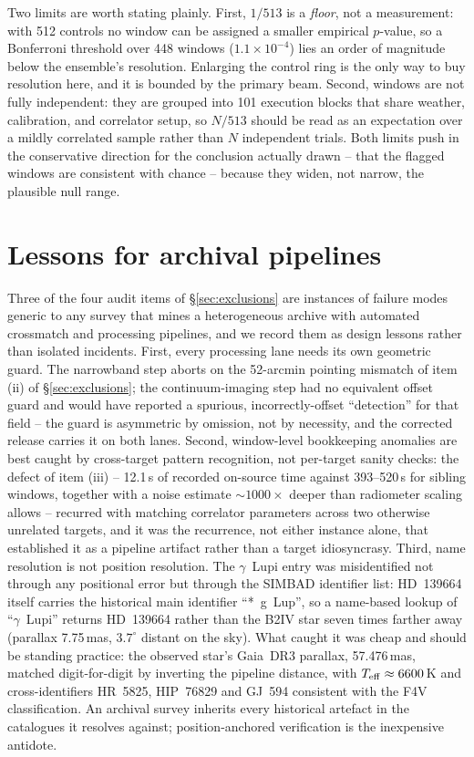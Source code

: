 \documentclass{openjournal}
\begin{document}
Two limits are worth stating plainly. First, $1/513$ is a
\emph{floor}, not a measurement: with 512 controls no window can be
assigned a smaller empirical $p$-value, so a Bonferroni threshold over
448 windows ($1.1\times10^{-4}$) lies an order of magnitude below the
ensemble's resolution. Enlarging the control ring is the only way to
buy resolution here, and it is bounded by the primary beam. Second,
windows are not fully independent: they are grouped into 101 execution
blocks that share weather, calibration, and correlator setup, so
$N/513$ should be read as an expectation over a mildly correlated
sample rather than $N$ independent trials. Both limits push in the
conservative direction for the conclusion actually drawn -- that the
flagged windows are consistent with chance -- because they widen, not
narrow, the plausible null range.

\section{Lessons for archival pipelines}
\label{app:lessons}

Three of the four audit items of \S\ref{sec:exclusions} are instances
of failure modes generic to any survey that mines a heterogeneous
archive with automated crossmatch and processing pipelines, and we
record them as design lessons rather than isolated incidents. First,
every processing lane needs its own geometric guard. The narrowband
step aborts on the 52-arcmin pointing mismatch of item (ii) of
\S\ref{sec:exclusions}; the continuum-imaging step had no equivalent
offset guard and would have reported a spurious, incorrectly-offset
``detection'' for that field -- the guard is asymmetric by omission,
not by necessity, and the corrected release carries it on both lanes.
Second, window-level bookkeeping anomalies are best caught by
cross-target pattern recognition, not per-target sanity checks: the
defect of item (iii) -- 12.1\,s of recorded on-source time against
393--520\,s for sibling windows, together with a noise estimate
${\sim}1000\times$ deeper than radiometer scaling allows -- recurred
with matching correlator parameters across two otherwise unrelated
targets, and it was the recurrence, not either instance alone, that
established it as a pipeline artifact rather than a target
idiosyncrasy. Third, name resolution is not position resolution. The
$\gamma$~Lupi entry was misidentified not through any positional error
but through the SIMBAD identifier list: HD~139664 itself carries the
historical main identifier ``*~g~Lup'', so a name-based lookup of
``$\gamma$~Lupi'' returns HD~139664 rather than the B2IV star seven
times farther away (parallax 7.75\,mas, $3.7^{\circ}$ distant on the
sky). What caught it was cheap and should be standing practice: the
observed star's Gaia~DR3 parallax, 57.476\,mas, matched
digit-for-digit by inverting the pipeline distance, with
$T_{\rm eff}\approx6600$\,K and cross-identifiers HR~5825, HIP~76829
and GJ~594 consistent with the F4V classification. An archival survey
inherits every historical artefact in the catalogues it resolves
against; position-anchored verification is the inexpensive antidote.
\end{document}
